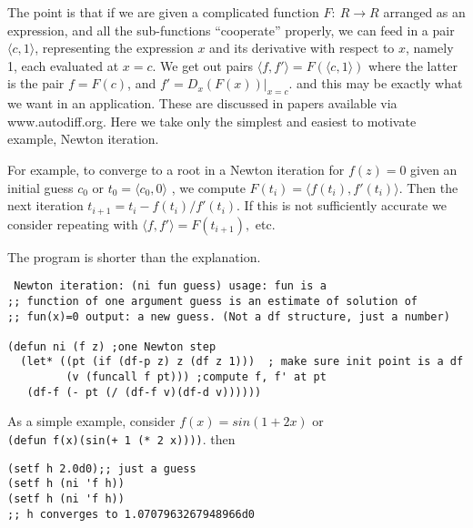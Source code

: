 \documentclass{article}
\begin{document}
{{The point is that if we are given a complicated function
$F:~R\rightarrow R$ arranged as an expression, and all the
sub-functions ``cooperate'' properly,  we can feed in a pair $\langle
c,1\rangle$, representing the expression $x$ and its derivative with
respect to $x$, namely 1, each evaluated at $x=c$.  We get out pairs
$\langle f,f'\rangle = F(\langle c,1\rangle )$ where the latter is the
pair $f=F(c)$, and $f'= D_x(F(x))|_{x=c}$.  and this may be exactly
what we want in an application. These are discussed in papers available
via www.autodiff.org.  Here we take only the simplest and easiest
to motivate example, Newton iteration.

For example, to converge to a root in a Newton iteration for $f(z)=0$
given an initial guess $c_0$ or $t_0= \langle c_0,0\rangle$ , we
compute $ F(t_{i}) = \langle f(t_i), f'(t_i)\rangle .$ Then the next
iteration $t_{i+1} = t_i - f(t_i)/f'(t_i)$.  If this is not
sufficiently accurate we consider repeating with $\langle f,f'\rangle
= F(t_{i+1}),$ etc.

The program is shorter than the explanation.
{
\begin{verbatim} Newton iteration: (ni fun guess) usage: fun is a
;; function of one argument guess is an estimate of solution of
;; fun(x)=0 output: a new guess. (Not a df structure, just a number)

(defun ni (f z) ;one Newton step
  (let* ((pt (if (df-p z) z (df z 1)))  ; make sure init point is a df
         (v (funcall f pt))) ;compute f, f' at pt
   (df-f (- pt (/ (df-f v)(df-d v))))))
\end{verbatim}

As a simple example, consider $f(x)=sin(1+2x)$ or\\
{\tt (defun f(x)(sin(+ 1 (* 2 x))))}.
 then
\begin{verbatim}
(setf h 2.0d0);; just a guess
(setf h (ni 'f h))
(setf h (ni 'f h))
;; h converges to 1.0707963267948966d0
\end{verbatim}

}}}
\end{document}
